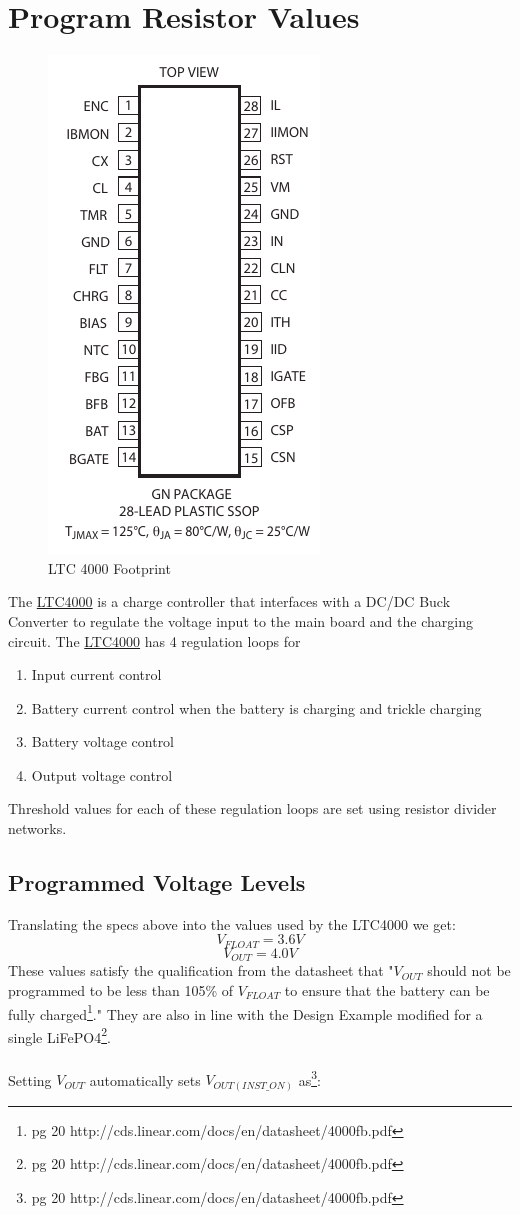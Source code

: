 \documentclass{article}
\begin{document}
\section{Program Resistor Values}
\begin{figure}[h]
\centering
\caption{LTC 4000 Footprint}
\includegraphics[width=.25\textwidth]{footprint}
\end{figure}
The \href{http://cds.linear.com/docs/en/datasheet/4000fa.pdf}{LTC4000} is a charge controller that interfaces with a DC/DC Buck Converter to regulate the voltage input to the main board  and the charging circuit. The \href{http://cds.linear.com/docs/en/datasheet/4000fa.pdf}{LTC4000} has 4 regulation loops for
\begin{enumerate}
\item Input current control
\item Battery current control when the battery is charging and trickle charging
\item Battery voltage control
\item Output voltage control
\end{enumerate}
Threshold values for each of these regulation loops are set using resistor divider networks. 

\subsection{Programmed Voltage Levels}
Translating the specs above into the values used by the LTC4000 we get:
\[V_{FLOAT} = 3.6V\]
\[V_{OUT} = 4.0V\]
These values satisfy the qualification from the datasheet that "$V_{OUT}$ should not be programmed to be less than 105\% of $V_{FLOAT}$ to ensure that the battery can be fully charged\footnote{pg 20 http://cds.linear.com/docs/en/datasheet/4000fb.pdf}." They are also in line with the Design Example modified for a single LiFePO4\footnote{pg 20 http://cds.linear.com/docs/en/datasheet/4000fb.pdf}.\\ \\
Setting $V_{OUT}$ automatically sets $V_{OUT(INST\_ON)}$ as\footnote{pg 20 http://cds.linear.com/docs/en/datasheet/4000fb.pdf}:
 
\end{document}
